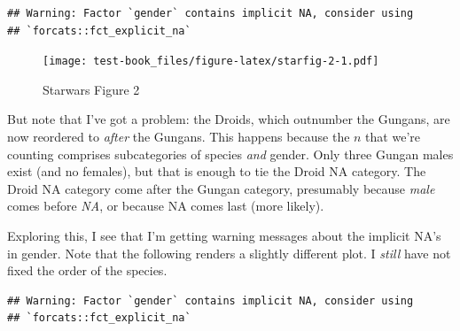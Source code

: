 \documentclass[]{book}
\newenvironment{Shaded}{\begin{snugshade}}{\end{snugshade}}
\newcommand{\DataTypeTok}[1]{\textcolor[rgb]{0.13,0.29,0.53}{#1}}
\newcommand{\DecValTok}[1]{\textcolor[rgb]{0.00,0.00,0.81}{#1}}
\newcommand{\KeywordTok}[1]{\textcolor[rgb]{0.13,0.29,0.53}{\textbf{#1}}}
\newcommand{\NormalTok}[1]{#1}
\newcommand{\OperatorTok}[1]{\textcolor[rgb]{0.81,0.36,0.00}{\textbf{#1}}}
\newcommand{\OtherTok}[1]{\textcolor[rgb]{0.56,0.35,0.01}{#1}}
\newcommand{\StringTok}[1]{\textcolor[rgb]{0.31,0.60,0.02}{#1}}
\begin{document}
\begin{verbatim}
## Warning: Factor `gender` contains implicit NA, consider using
## `forcats::fct_explicit_na`
\end{verbatim}

\begin{figure}
\centering
\texttt{[image: test-book\_files/figure-latex/starfig-2-1.pdf]}
\caption{\label{fig:starfig-2}Starwars Figure 2}
\end{figure}

But note that I've got a problem: the Droids, which outnumber the Gungans, are now reordered to \emph{after} the Gungans. This happens because the \(n\) that we're counting comprises subcategories of species \emph{and} gender. Only three Gungan males exist (and no females), but that is enough to tie the Droid NA category. The Droid NA category come after the Gungan category, presumably because \emph{male} comes before \emph{NA}, or because NA comes last (more likely).

Exploring this, I see that I'm getting warning messages about the implicit NA's in gender. Note that the following renders a slightly different plot. I \emph{still} have not fixed the order of the species.

\begin{Shaded}
\end{Shaded}

\begin{verbatim}
## Warning: Factor `gender` contains implicit NA, consider using
## `forcats::fct_explicit_na`
\end{verbatim}
\end{document}
